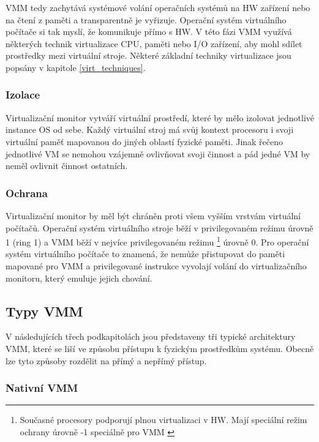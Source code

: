 VMM tedy zachytává systémové volání operačních systémů na HW zařízení nebo na čtení z paměti a transparentně je vyřizuje. Operační systém virtuálního počítače si tak myslí, že komunikuje přímo s HW. V této fázi VMM využívá 
některých technik virtualizace CPU, paměti nebo I/O zařízení, aby mohl sdílet prostředky mezi virtuální stroje. Některé základní techniky virtualizace jsou popsány v kapitole \ref{virt_techniques}.

\subsubsection*{Izolace}

Virtualizační monitor vytváří virtuální prostředí, které by mělo izolovat jednotlivé instance OS od sebe. Každý virtuální stroj má svůj kontext procesoru i svoji virtuální paměť mapovanou do jiných oblastí fyzické paměti.
Jinak řečeno jednotlivé VM se nemohou vzájemně ovlivňovat svoji činnost a pád jedné VM by neměl ovlivnit činnost ostatních.


\subsubsection*{Ochrana}

Virtualizační monitor by měl být chráněn proti všem vyšším vrstvám virtuální počítačů. Operační systém virtuálního stroje běží v privilegovaném režimu úrovně 1 (ring 1) a VMM běží v nejvíce privilegovaném režimu \footnote[1]{Současné procesory podporují plnou virtualizaci v HW. Mají speciální 
režim ochrany úrovně -1 speciálně pro VMM \cite{virt2}} úrovně 0. Pro operační systém virtuálního počítače to znamená, že nemůže přistupovat do paměti mapované pro VMM a privilegované instrukce vyvolají volání do virtualizačního monitoru, který emuluje jejich chování. 


\subsection{Typy VMM}

V následujících třech podkapitolách jsou představeny tři typické architektury VMM, které se liší ve způsobu přístupu k fyzickým prostředkům systému. Obecně lze tyto způsoby rozdělit na přímý a nepřímý přístup.

\subsubsection*{Nativní VMM}

